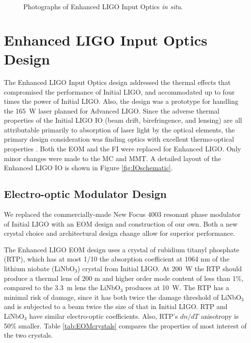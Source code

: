 \begin{figure}
\begin{centering}
\caption[Photographs of Enhanced LIGO Input
Optics \emph{in situ}]{Photographs of Enhanced LIGO Input Optics
  \emph{in situ}.} %
\label{fig:IOpictures}
\end{centering}
\end{figure}



\section{Enhanced LIGO Input Optics Design}
\label{sec:design}
The Enhanced LIGO Input Optics design addressed the thermal effects
that compromised the performance of Initial LIGO, and accommodated up
to four times the power of Initial LIGO. Also, the design was a
prototype for handling the 165~W laser planned for Advanced
LIGO. Since the adverse thermal properties of the Initial LIGO IO
(beam drift, birefringence, and lensing) are all attributable
primarily to absorption of laser light by the optical elements, the
primary design consideration was finding optics with excellent
thermo-optical properties \citep{UFLIGOGroup2006Upgrading}. Both the
EOM and the FI were replaced for Enhanced LIGO. Only minor changes
were made to the MC and MMT. A detailed layout of the Enhanced LIGO IO
is shown in Figure \ref{fig:IOschematic}.


\subsection{Electro-optic Modulator Design}
We replaced the commercially-made New Focus 4003 resonant phase
modulator of Initial LIGO with an EOM design and construction of our
own. Both a new crystal choice and architectural design change allow
for superior performance.

The Enhanced LIGO EOM design uses a crystal of rubidium titanyl
phosphate (RTP), which has at most 1/10 the absorption coefficient at
1064 nm of the lithium niobate (LiNbO$_3$) crystal from Initial
LIGO. At 200~W the RTP should produce a thermal lens of 200 m and
higher order mode content of less than 1\%, compared to the 3.3~m lens
the LiNbO$_3$ produces at 10~W. The RTP has a minimal risk of damage,
since it has both twice the damage threshold of LiNbO$_3$ and is
subjected to a beam twice the size of that in Initial LIGO. RTP and
LiNbO$_3$ have similar electro-optic coefficients. Also, RTP's $dn/dT$
anisotropy is 50\% smaller. Table \ref{tab:EOMcrystals} compares the
properties of most interest of the two crystals.

